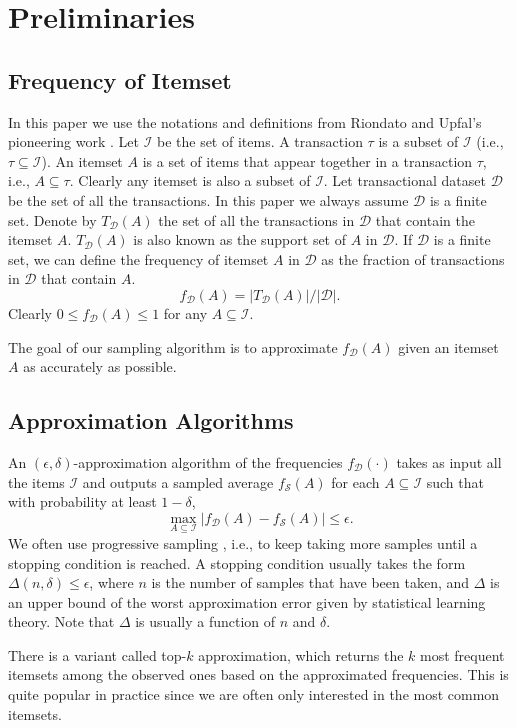 \documentclass{article}
\begin{document}
\section{Preliminaries}
\label{sec:prlm}
\subsection{Frequency of Itemset}
\newcommand{\I}{\mathcal{I}}
\newcommand{\D}{\mathcal{D}}
In this paper we use the notations and definitions from Riondato and Upfal's pioneering work \cite{RU15}. 
Let $\I$ be the set of items. A transaction $\tau$ is a subset of $\I$ (i.e., $\tau \subseteq \I$).
An itemset $A$ is a set of items that appear together in a transaction $\tau$, i.e., $A \subseteq \tau$. Clearly any itemset is also a subset of $\I$. 
Let transactional dataset $\D$ be the set of all the transactions. In this paper we always assume $\D$ is a finite set. Denote by $T_\D(A)$ the set of all the transactions in $\D$ that contain the itemset $A$. $T_\D(A)$ is also known as the support set of $A$ in $\D$.
If $\D$ is a finite set, we can define the frequency of itemset $A$ in $\D$ as the fraction of transactions in $\D$ that contain $A$.
$$f_\D(A) = |T_\D(A)|/|\D|.$$
Clearly $0 \leq f_\D(A) \leq 1$ for any $A \subseteq \I$.

The goal of our sampling algorithm is to approximate $f_\D(A)$ given an itemset $A$ as accurately as possible.

\subsection{Approximation Algorithms}
\newcommand{\Smp}{\mathcal{S}}
An $(\epsilon,\delta)$-approximation algorithm of the frequencies $f_\D(\cdot)$ takes as input all the items $\I$ and outputs a sampled average $f_\Smp(A)$ for each $A\subseteq\I$ such that with probability at least $1-\delta$,
$$\max_{A\subseteq\I}|f_\D(A) - f_\Smp(A)| \leq \epsilon.$$
We often use progressive sampling \cite{RU15,RU16}, i.e., to keep taking more samples until a stopping condition is reached. A stopping condition usually takes the form $\Delta(n, \delta) \leq \epsilon$, where $n$ is the number of samples that have been taken, and $\Delta$ is an upper bound of the worst approximation error given by statistical learning theory. Note that $\Delta$ is usually a function of $n$ and $\delta$.

There is a variant called top-$k$ approximation, which returns the $k$ most frequent itemsets among the observed ones based on the approximated frequencies. This is quite popular in practice since we are often only interested in the most common itemsets. 
\end{document}
